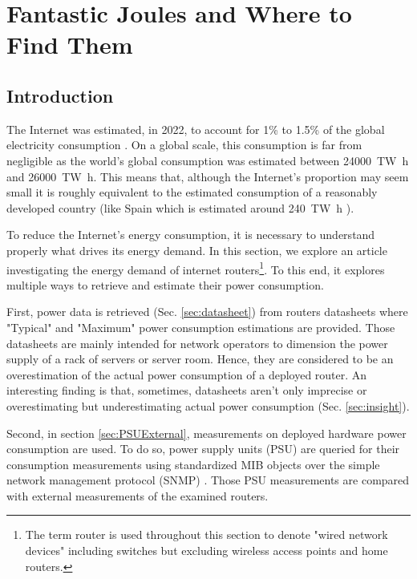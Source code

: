 
\section{Fantastic Joules and Where to Find Them} \label{sec:FantJoul}

\subsection{Introduction} 
The Internet was estimated, in 2022, to account for 1\% to 1.5\% of the global electricity consumption \cite{NetPerc}. 
On a global scale, this consumption is far from negligible as the world's global consumption was estimated between \qty{24 000}{\tera\watt\hour} and \qty{26 000}{\tera\watt\hour}. 
This means that, although the Internet's proportion may seem small it is roughly equivalent to the estimated consumption of a reasonably developed country (like Spain which is estimated around \qty{240}{\tera\watt\hour} \cite{NetPerc}). 

To reduce the Internet's energy consumption, it is necessary to understand properly what drives its energy demand.
In this section, we explore an article \cite{FantasticJoul} investigating the energy demand of internet routers\footnote{The term router is used throughout this section to denote "wired network devices" including switches but excluding wireless access points and home routers.}.
To this end, it explores multiple ways to retrieve and estimate their power consumption. 

First, power data is retrieved (Sec. \ref{sec:datasheet}) from routers datasheets where "Typical" and "Maximum" power consumption estimations are provided.
Those datasheets are mainly intended for network operators to dimension the power supply of a rack of servers or server room. 
Hence, they are considered to be an overestimation of the actual power consumption of a deployed router.  
An interesting finding is that, sometimes, datasheets aren't only imprecise or overestimating but underestimating actual power consumption (Sec. \ref{sec:insight}).  

Second, in section \ref{sec:PSUExternal}, measurements on deployed hardware power consumption are used. 
To do so, power supply units (PSU) are queried for their consumption measurements using standardized MIB objects over the simple network management protocol (SNMP) \cite{snmprfc}.
Those PSU measurements are compared with external measurements of the examined routers.

